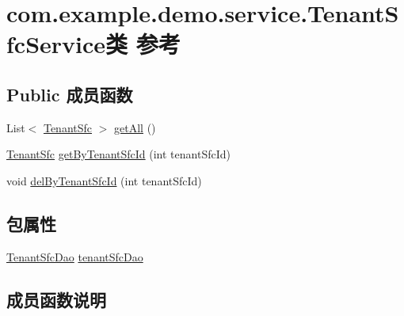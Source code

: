 \hypertarget{classcom_1_1example_1_1demo_1_1service_1_1_tenant_sfc_service}{}\section{com.\+example.\+demo.\+service.\+Tenant\+Sfc\+Service类 参考}
\label{classcom_1_1example_1_1demo_1_1service_1_1_tenant_sfc_service}
\subsection*{Public 成员函数}
\begin{DoxyCompactItemize}
\item 
List$<$ \mbox{\hyperlink{classcom_1_1example_1_1demo_1_1modular_1_1_tenant_sfc}{Tenant\+Sfc}} $>$ \mbox{\hyperlink{classcom_1_1example_1_1demo_1_1service_1_1_tenant_sfc_service_a3ba9cea12be6a0b8867db4a053e3bb1d}{get\+All}} ()
\item 
\mbox{\hyperlink{classcom_1_1example_1_1demo_1_1modular_1_1_tenant_sfc}{Tenant\+Sfc}} \mbox{\hyperlink{classcom_1_1example_1_1demo_1_1service_1_1_tenant_sfc_service_a98ac99a527f048627f6154980ce149c0}{get\+By\+Tenant\+Sfc\+Id}} (int tenant\+Sfc\+Id)
\item 
void \mbox{\hyperlink{classcom_1_1example_1_1demo_1_1service_1_1_tenant_sfc_service_ab04b1a4a40dbcd6e73155edcfcc89a49}{del\+By\+Tenant\+Sfc\+Id}} (int tenant\+Sfc\+Id)
\end{DoxyCompactItemize}
\subsection*{包属性}
\begin{DoxyCompactItemize}
\item 
\mbox{\hyperlink{interfacecom_1_1example_1_1demo_1_1dao_1_1_tenant_sfc_dao}{Tenant\+Sfc\+Dao}} \mbox{\hyperlink{classcom_1_1example_1_1demo_1_1service_1_1_tenant_sfc_service_a77017e1d7336b08e1d868493c7e6bee0}{tenant\+Sfc\+Dao}}
\end{DoxyCompactItemize}


\subsection{成员函数说明}
\mbox{\label{classcom_1_1example_1_1demo_1_1service_1_1_tenant_sfc_service_ab04b1a4a40dbcd6e73155edcfcc89a49}} 
